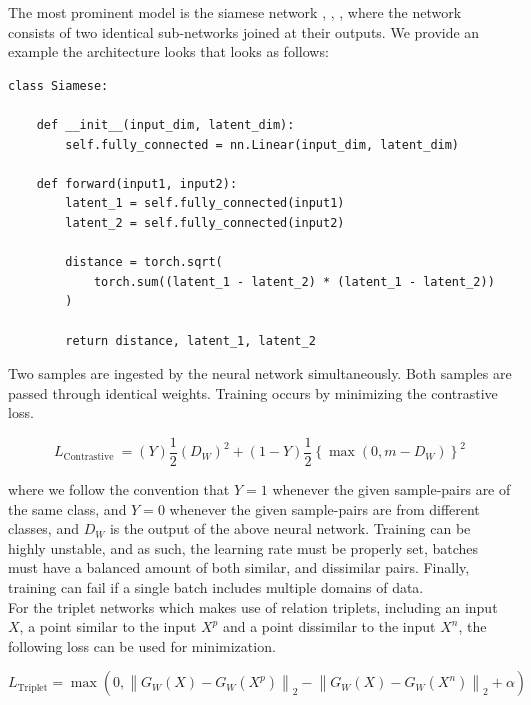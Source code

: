 \documentclass[a4paper,12pt,twoside,openright]{report}
\begin{document}
The most prominent model is the siamese network \cite{bromley94}, \cite{chopra05}, \cite{hadsell06}, where the network consists of two identical sub-networks joined at their outputs. 
We provide an example the architecture looks that looks as follows:

\begin{verbatim}
class Siamese:

    def __init__(input_dim, latent_dim):
        self.fully_connected = nn.Linear(input_dim, latent_dim)
        
    def forward(input1, input2):
        latent_1 = self.fully_connected(input1)
        latent_2 = self.fully_connected(input2)
        
        distance = torch.sqrt(
            torch.sum((latent_1 - latent_2) * (latent_1 - latent_2))
        )
        
        return distance, latent_1, latent_2
\end{verbatim}

Two samples are ingested by the neural network simultaneously.
Both samples are passed through identical weights.
Training occurs by minimizing the contrastive loss.

\begin{equation}
L_{\text {Contrastive }}=(Y) \frac{1}{2}\left(D_{W}\right)^{2}+(1-Y) \frac{1}{2}\left\{\max \left(0, m-D_{W}\right)\right\}^{2}
\end{equation}

where we follow the convention that $Y=1$ whenever the given sample-pairs are of the same class, and $Y=0$ whenever the given sample-pairs are from different classes, and $D_W$ is the output of the above neural network.
Training can be highly unstable, and as such, the learning rate must be properly set, batches must have a balanced amount of both similar, and dissimilar pairs. 
Finally, training can fail if a single batch includes multiple domains of data. \\

For the triplet networks \cite{hoffer14} which makes use of relation triplets, including an input $X$, a point similar to the input $X^p$ and a point dissimilar to the input $X^n$, the following loss can be used for minimization.

\begin{equation}
L_{\text {Triplet}}=\max \left(0,\left\|G_{W}(X)-G_{W}\left(X^{p}\right)\right\|_{2}-\left\|G_{W}(X)-G_{W}\left(X^{n}\right)\right\|_{2}+\alpha\right)
\end{equation} 
\end{document}
